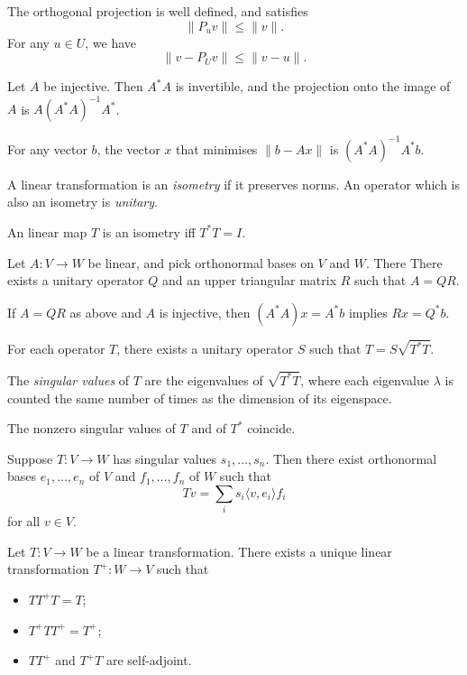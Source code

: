 \begin{prop}
  The orthogonal projection is well defined, and satisfies
  \[\|P_u v\|\le \|v\|.\] For any $u\in U$, we have
  \[\|v-P_U v\|\le \|v-u\|.\]
\end{prop}
\begin{prop}
    Let $A$ be injective. Then $A^* A$ is invertible, and the projection
    onto the image of $A$ is $A(A^* A)^{-1}A^*$.
\end{prop}
\begin{cor}
    For any vector $b$, the vector $x$ that minimises $\|b-Ax\|$ is $(A^*
    A)^{-1} A^* b$.
\end{cor}
\begin{defn}
  A linear transformation is an \emph{isometry} if it preserves norms. An
  operator which is also an isometry is \emph{unitary}.
\end{defn}
\begin{prop}
    An linear map $T$ is an isometry iff $T^*T=I$.
\end{prop}
\begin{thm}[QR Decomposition]
    Let $A:V\to W$ be linear, and pick orthonormal bases on $V$ and $W$. There
    There exists a unitary operator $Q$ and an upper triangular matrix $R$ such
    that $A=QR$.
\end{thm}
\begin{prop}
    If $A=QR$ as above and $A$ is injective, then $(A^* A)x=A^*b$ implies $Rx=Q^*
    b$.
\end{prop}
\begin{thm}
  For each operator $T$, there exists a unitary operator $S$ such that
  $T=S\sqrt{T^*T}$.
\end{thm}
\begin{defn}
  The \emph{singular values} of $T$ are the eigenvalues of $\sqrt{T^*T}$,
  where each eigenvalue $\lambda$ is counted the same number of times as the
  dimension of its eigenspace.
\end{defn}
\begin{prop}
  The nonzero singular values of $T$ and of $T^*$ coincide.
\end{prop}
\begin{thm}
  Suppose $T:V\to W$ has singular values $s_1,\ldots,s_n$. Then there exist
  orthonormal bases $e_1,\ldots,e_n$ of $V$ and $f_1,\ldots,f_n$ of $W$ such that
  \[Tv=\sum_i s_i\langle v,e_i\rangle f_i\]
  for all $v\in V$.
\end{thm}
\begin{prop}
  Let $T:V\to W$ be a linear transformation. There exists a unique linear
  transformation $T^+:W\to V$ such that
  \begin{itemize}
    \item $TT^+T=T$;
    \item $T^+TT^+=T^+$;
    \item $TT^+$ and $T^+T$ are self-adjoint.
  \end{itemize}
\end{prop}
